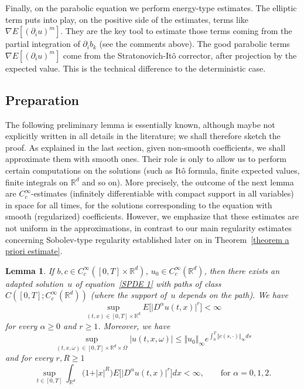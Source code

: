 \documentclass[a4paper,10pt]{article}
\newtheorem{lemma}[theorem]{Lemma}
\newcommand\1{\mathbbm{1}}
\numberwithin{equation}{section}
\begin{document}
Finally, on the parabolic equation we perform energy-type estimates. The elliptic term puts into play, on the positive side of the estimates, terms like
$\nabla E[ (\partial_{i}u)^{m}]$. They are the key tool to estimate those terms coming from the partial integration of $\partial_{i}b_{k}$ (see the comments above). The good parabolic terms $\nabla E[(\partial_{i}u)^{m}]$ come from the Stratonovich-It\^{o} corrector, after projection by the expected value.  This is the technical difference to the deterministic case. 

\subsection{Preparation}

The following preliminary lemma is essentially known, although maybe not explicitly written in all details in the literature; we shall therefore sketch the proof. As
explained in the last section, given non-smooth coefficients, we shall approximate them with smooth ones. Their role is only to allow us to perform certain computations on the solutions (such as It\^{o} formula, finite expected values, finite integrals on $\mathbb{R}^{d}$ and so on). More precisely, the outcome of the next lemma are $C_{c}^{\infty}$-estimates (infinitely differentiable with compact support in all variables) in space for all times, for the solutions corresponding to the equation with smooth (regularized) coefficients. However, we emphasize that these estimates are not uniform in the approximations, in contrast to our main regularity estimates concerning Sobolev-type regularity established later on in Theorem~\ref{theorem a priori estimate}. 

\begin{lemma}
\label{lemma preliminare sul caso smooth}
If $b , c\in C_{c}^{\infty}([0,T] \times \mathbb{R}^{d})$, $u_{0} \in C_{c}^{\infty}(\mathbb{R}^{d})$, then there exists an adapted solution~$u$ of equation~\eqref{SPDE 1} with paths of class $C([0,T];C_{c}^{\infty}(\mathbb{R}^{d}))$ \textup{(}where the support of~$u$ depends on the path\textup{)}. We have
\begin{equation}
\sup_{(t,x) \in [0,T] \times \mathbb{R}^{d}}E \big[ \vert D^{\alpha}u(t,x) \vert^{r}\big]
<\infty \label{ineq 1 lemma smooth}
\end{equation}
for every $\alpha\geq0$ and $r\geq1$. Moreover, we have
\begin{equation}
\sup_{(t,x,\omega)  \in [0,T] \times \mathbb{R}^{d} \times \Omega} \vert u(t,x,\omega) \vert
\leq \Vert u_{0} \Vert_{\infty} e^{\int_{0}^{T}\Vert c (s,\cdot) \Vert_{\infty} ds} \label{ineq 2 lemma smooth}
\end{equation}
and for every $r,R\geq1$
\begin{equation}
\sup_{t\in [0,T]} \int_{\mathbb{R}^{d}} \big(1+\vert x \vert^{R} \big)  E \big[\vert D^{\alpha} u(t,x) \vert^{r} \big]  dx < \infty,\qquad \text{for }\alpha=0,1,2. 
\label{ineq 3 lemma smooth}
\end{equation}
\end{lemma}
\end{document}
